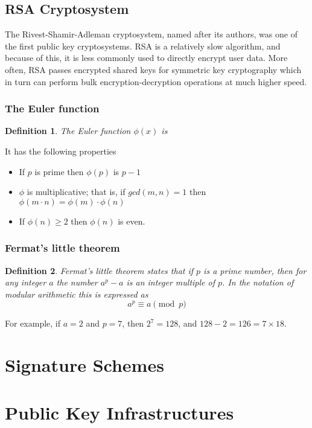 \documentclass{article}
\theoremstyle{quest}
\newtheorem*{definition}{Definition}
\begin{document}
\subsection{RSA Cryptosystem}
The Rivest-Shamir-Adleman cryptosystem,
named after its authors, was one of the first public key cryptosystems.
RSA is a relatively slow algorithm, and because of this,
it is less commonly used to directly encrypt user data.
More often, RSA passes encrypted shared keys for symmetric key cryptography
which in turn can perform bulk encryption-decryption operations at much higher speed.

\subsubsection{The Euler function}
\begin{definition}
    The \textit{Euler function} $\phi(x)$ is
\end{definition}
It has the following properties
\begin{itemize}
    \item If $p$ is prime then $\phi(p)$ is $p - 1$
    \item $\phi$ is multiplicative; that is,
        if $gcd(m,n) = 1$ then $\phi(m \cdot n) = \phi(m) \cdot \phi(n)$
    \item If $\phi(n) \geq 2$ then $\phi(n)$ is even.
\end{itemize}

\subsubsection{Fermat's little theorem}
\begin{definition}
    \textit{Fermat's little theorem} states that if $p$ is a prime number,
    then for any integer $a$ the number $a^p - a$ is an integer multiple of $p$.
    In the notation of modular arithmetic this is expressed as
    $$ a^p \equiv a \pmod p $$
\end{definition}
For example, if $a = 2$ and $p = 7$, then $2^7 = 128$, and $128 − 2 = 126 = 7 × 18$.

\section{Signature Schemes}

\section{Public Key Infrastructures}
\end{document}
